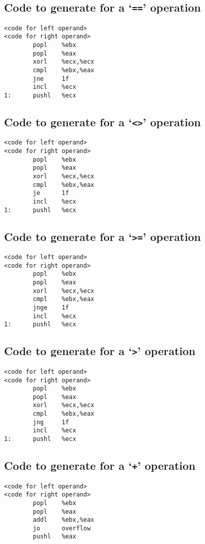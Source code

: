 \documentclass{article}
\begin{document}
\subsection*{Code to generate for a `\texttt{==}' operation}
\begin{verbatim}
<code for left operand>
<code for right operand>
        popl    %ebx
        popl    %eax
        xorl    %ecx,%ecx
        cmpl    %ebx,%eax
        jne     1f
        incl    %ecx
1:      pushl   %ecx
\end{verbatim}

\subsection*{Code to generate for a `\texttt{<>}' operation}
\begin{verbatim}
<code for left operand>
<code for right operand>
        popl    %ebx
        popl    %eax
        xorl    %ecx,%ecx
        cmpl    %ebx,%eax
        je      1f
        incl    %ecx
1:      pushl   %ecx
\end{verbatim}

\subsection*{Code to generate for a `\texttt{>=}' operation}
\begin{verbatim}
<code for left operand>
<code for right operand>
        popl    %ebx
        popl    %eax
        xorl    %ecx,%ecx
        cmpl    %ebx,%eax
        jnge    1f
        incl    %ecx
1:      pushl   %ecx
\end{verbatim}

\subsection*{Code to generate for a `\texttt{>}' operation}
\begin{verbatim}
<code for left operand>
<code for right operand>
        popl    %ebx
        popl    %eax
        xorl    %ecx,%ecx
        cmpl    %ebx,%eax
        jng     1f
        incl    %ecx
1:      pushl   %ecx
\end{verbatim}

\subsection*{Code to generate for a `\texttt{+}' operation}
\begin{verbatim}
<code for left operand>
<code for right operand>
        popl    %ebx
        popl    %eax
        addl    %ebx,%eax
        jo      overflow
        pushl   %eax
\end{verbatim}
\end{document}
